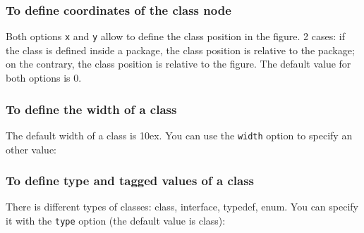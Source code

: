 \documentclass[a4paper,11pt]{report}
\begin{document}
\subsubsection{To define coordinates of the class node}\label{ss.classcoords}

\begin{minipage}{0.5\textwidth}
	
\end{minipage}
\begin{minipage}{0.4\textwidth}
	\begin{center}
	\end{center}
\end{minipage}

\medskip

Both options {\tt x} and {\tt y} allow to define the class position in the figure. 2 cases:
if the class is defined inside a package, the class position is relative to the package;
on the contrary, the class position is relative to the figure. The default value for both options is 0.

\subsubsection{To define the width of a class}\label{ss.classwidth}

The default width of a class is 10ex. You can use the {\tt width} option to specify an other value:

\medskip

\begin{minipage}{0.5\textwidth}
	
\end{minipage}
\begin{minipage}{0.4\textwidth}
	\begin{center}
	\end{center}
\end{minipage}

\subsubsection{To define type and tagged values of a class}\label{ss.classtype}

There is different types of classes: class, interface, typedef, enum. You can specify it with the {\tt type} option (the default value is class):

\medskip

\begin{minipage}{0.5\textwidth}
	
\end{minipage}
\begin{minipage}{0.4\textwidth}
	\begin{center}
	\end{center}
\end{minipage}
\end{document}
